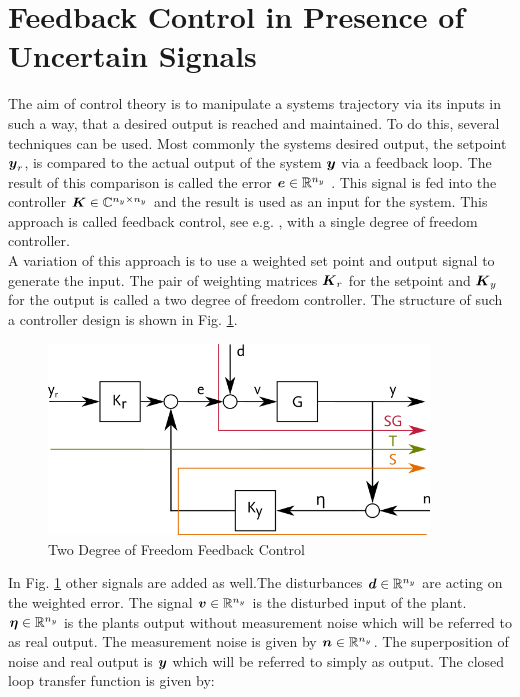 \section{Feedback Control in Presence of Uncertain Signals}

The aim of control theory is to manipulate a systems trajectory via its inputs in such a way, that a desired output is reached and maintained. To do this, several techniques can be used. Most commonly the systems desired output, the setpoint $\mbox{\boldmath$y$}_r$, is compared to the actual output of the system $\mbox{\boldmath$y$}$ via a feedback loop. The result of this comparison is called the error $\mbox{\boldmath$e$} \in \mathbb{R}^{n_y}$ . This signal is fed into the controller $\mbox{\boldmath$K$} \in \mathbb{C}^{n_y \times n_y}$  and the result is used as an input for the system. This approach is called feedback control, see e.g. \cite{Astrom2009}, with a single degree of freedom controller.\\

A variation of this approach is to use a weighted set point and output signal to generate the input. The pair of weighting matrices $\mbox{\boldmath$K$}_r$  for the setpoint and $\mbox{\boldmath$K$}_y$ for the output is called a two degree of freedom controller. The structure of such a controller design is shown in Fig. \ref{c:control:f:2dofclosedloop}.

\begin{figure}[H]
\begin{minipage}[b]{\textwidth}
\centering
\includegraphics[width=0.9\textwidth]{./Graphics/2DOFCLOSEDLOOP.png}
\caption{Two Degree of Freedom Feedback Control}
\label{c:control:f:2dofclosedloop}
\end{minipage}
\end{figure}

In Fig. \ref{c:control:f:2dofclosedloop} other signals are added as well.The disturbances $\mbox{\boldmath$d$} \in \mathbb{R}^{n_y}$ are acting on the weighted error. The signal $\mbox{\boldmath$v$} \in \mathbb{R}^{n_y}$ is the disturbed input of the plant. $\mbox{\boldmath$\eta$} \in \mathbb{R}^{n_y}$ is the plants output without measurement noise which will be referred to as real output. The measurement noise is given by $\mbox{\boldmath$n$} \in \mathbb{R}^{n_y}$. The superposition of noise and real output is $\mbox{\boldmath$y$}$ which will be referred to simply as output. The closed loop transfer function is given by:

